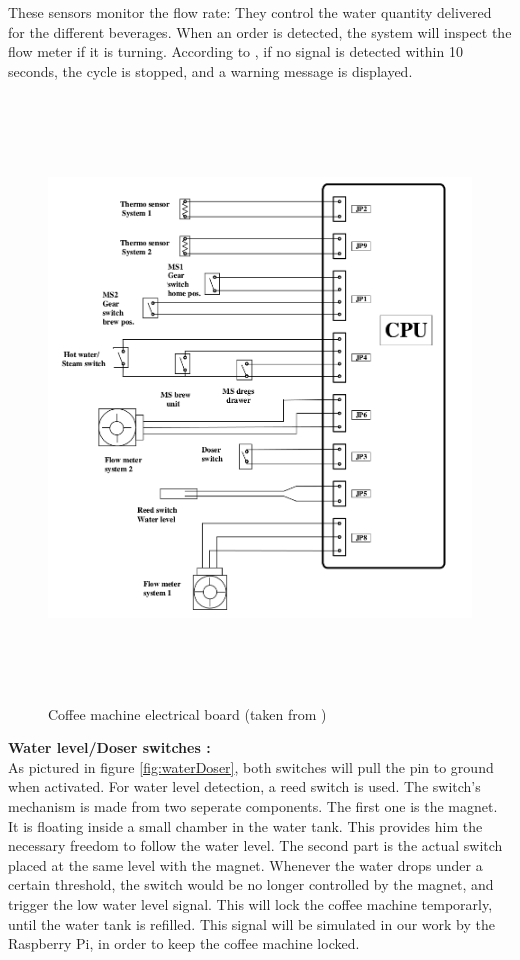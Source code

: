 \documentclass[12pt]{article}
\begin{document}
  These sensors monitor the flow rate: They control the water quantity delivered for the different beverages. 
  When an order is detected, the system will inspect the flow meter if it is turning.
  According to \cite{Saeco} , if no signal is detected within 10 seconds, the cycle is stopped, and a warning message is displayed.\\
  \begin{figure}[H]
   \centering
   \includegraphics[height=16cm]{./images/machinePins}
   \captionsetup{justification=centering}
   \caption{Coffee machine electrical board (taken from \cite{Saeco})}
   \label{fig:machinePins}
  \end{figure}
  \textbf{Water level/Doser switches :}\\
  
  As pictured in figure \ref{fig:waterDoser}, both switches will pull the pin to ground when activated.
  For water level detection, a reed switch is used. The switch's mechanism is made from two seperate components. The first one is the magnet. 
  It is floating inside a small chamber in the water tank. This provides him the necessary freedom to follow the water level. 
  The second part is the actual switch placed at the same level with the magnet. 
  Whenever the water drops under a certain threshold, the switch would be no longer controlled by the magnet, and trigger the low water level signal. 
  This will lock the coffee machine temporarly, until the water tank is refilled. 
  This signal will be simulated in our work by the Raspberry Pi, in order to keep the coffee machine locked.
  
\end{document}
